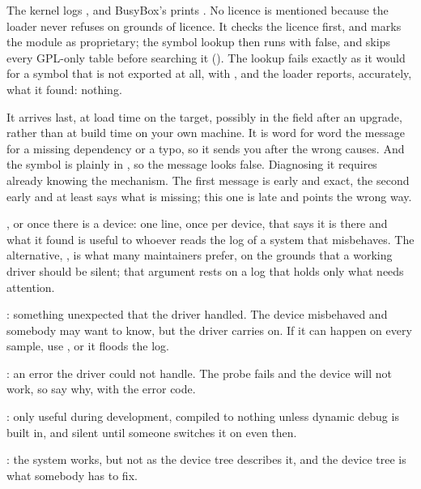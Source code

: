  The kernel logs , and BusyBox's
 prints . No licence is mentioned
because the loader never refuses on grounds of licence. It checks the licence first, and marks the
module as proprietary; the symbol lookup then runs with  false, and
 skips every GPL-only table before searching it
(). The lookup fails exactly as it would for a symbol that is not exported at all,
with , and the loader reports, accurately, what it found: nothing.

 It arrives last, at load time on the target, possibly in the field after an upgrade,
rather than at build time on your own machine. It is word for word the message for a missing
dependency or a typo, so it sends you after the wrong causes. And the symbol is plainly in
, so the message looks false. Diagnosing it requires already knowing the
mechanism. The first message is early and exact, the second early and at least says what is
missing; this one is late and points the wrong way.


 , or  once there is a device: one line, once per device,
that says it is there and what it found is useful to whoever reads the log of a system that
misbehaves. The alternative, , is what many maintainers prefer, on the grounds that a
working driver should be silent; that argument rests on a log that holds only what needs attention.

 : something unexpected that the driver handled. The device misbehaved and
somebody may want to know, but the driver carries on. If it can happen on every sample, use
, or it floods the log.

 : an error the driver could not handle. The probe fails and the device will
not work, so say why, with the error code.

 : only useful during development, compiled to nothing unless dynamic debug
is built in, and silent until someone switches it on even then.

 : the system works, but not as the device tree describes it, and the device
tree is what somebody has to fix.

